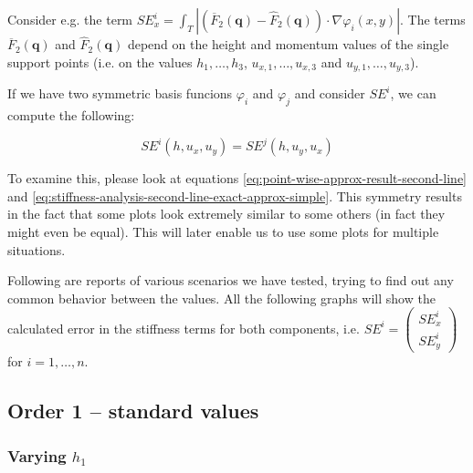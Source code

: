 \documentclass{article}
\renewcommand{\phi}{\varphi}
\begin{document}
Consider e.g. the term $SE_x^i = \int_T \left| \left(\overline{F}_2(\mathbf{q})-\widehat{F}_2(\mathbf{q})\right) \cdot \nabla\phi_i(x,y) \right|$. The terms $\overline{F}_2(\mathbf{q})$ and $\widehat{F}_2(\mathbf{q})$ depend on the height and momentum values of the single support points (i.e. on the values $h_1,\dots,h_3$, $u_{x,1},\dots,u_{x,3}$ and $u_{y,1},\dots,u_{y,3}$).

If we have two symmetric basis funcions $\phi_i$ and $\phi_j$ and consider $SE^i$, we can compute the following:

\begin{equation*}
  SE^i(h, u_x, u_y) = SE^j(h, u_y, u_x)
\end{equation*}

To examine this, please look at equations \eqref{eq:point-wise-approx-result-second-line} and \eqref{eq:stiffness-analysis-second-line-exact-approx-simple}. This symmetry results in the fact that some plots look extremely similar to some others (in fact they might even be equal). This will later enable us to use some plots for multiple situations.


Following are reports of various scenarios we have tested, trying to find out any common behavior between the values. All the following graphs will show the calculated error in the stiffness terms for both components, i.e. $SE^i =
\begin{pmatrix}
  SE_x^i \\ SE_y^i
\end{pmatrix}$ for $i=1,\dots, n$.

\subsection{Order 1 -- standard values}
\label{sec:stiffness-analysis-order-1-standard}

\subsubsection{\texorpdfstring{Varying $h_1$}{Varying h1}}
\label{sec:stiffness-analysis-standard-values-var-h1}
\end{document}
